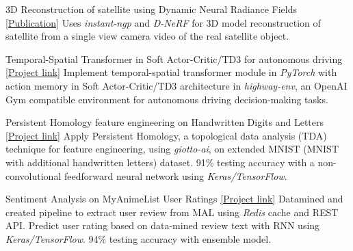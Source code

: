 \vspace{-5mm}
\vspace{-2mm}

\begin{cventries}

	\cventry
	{}
	{3D Reconstruction of satellite using Dynamic Neural Radiance Fields}
	{\href{https://arxiv.org/abs/2301.09060}{[Publication]}}
	{}
	{Uses \emph{instant-ngp} and \emph{D-NeRF} for 3D model reconstruction of satellite from a single view camera video of the real satellite object.}

	\cventry
	{}
	{Temporal-Spatial Transformer in Soft Actor-Critic/TD3 for autonomous driving}
	{\href{https://github.com/sesem738/Lavenza}{[Project link]}}
	{}
	{Implement temporal-spatial transformer module in \emph{PyTorch} with action memory in Soft Actor-Critic/TD3 architecture in \emph{highway-env}, an OpenAI Gym compatible environment for autonomous driving decision-making tasks.}

	\cventry
	{}
	{Persistent Homology feature engineering on Handwritten Digits and Letters}
	{\href{https://colab.research.google.com/drive/18z161k3diYO6sNVBfiKH8uGqbrekxMPN?usp=sharing}{[Project link]}}
	{}
	{Apply Persistent Homology, a topological data analysis (TDA) technique for feature engineering, using \emph{giotto-ai}, on extended MNIST (MNIST with additional handwritten letters) dataset. 91\% testing accuracy with a non-convolutional feedforward neural network using \emph{Keras/TensorFlow}.}


	\cventry
	{}
	{Sentiment Analysis on MyAnimeList User Ratings}
	{\href{https://github.com/n0k0m3/rnn-mal-sentiment}{[Project link]}}
	{}
	{Datamined and created pipeline to extract user review from MAL using \emph{Redis} cache and REST API. Predict user rating based on data-mined review text with RNN using \emph{Keras/TensorFlow}. 94\% testing accuracy with ensemble model.}



\end{cventries}
